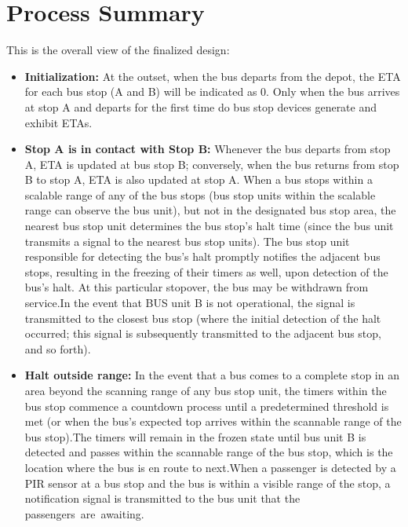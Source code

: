 

\section{Process Summary}

This is the overall view of the finalized design:
\begin{itemize}

\item \textbf{Initialization: }At the outset, when the bus departs from the depot, the ETA for each bus stop (A and B) will be indicated as 0. Only when the bus arrives at stop A and departs for the first time do bus stop devices generate and exhibit ETAs.

\item
\textbf{Stop A is in contact with Stop B: }
Whenever the bus departs from stop A, ETA is updated at bus stop B; conversely, when the bus returns from stop B to stop A, ETA is also updated at stop A. When a bus stops within a scalable range of any of the bus stops (bus stop units within the scalable range can observe the bus unit), but not in the designated bus stop area, the nearest bus stop unit determines the bus stop's halt time (since the bus unit transmits a signal to the nearest bus stop units). The bus stop unit responsible for detecting the bus's halt promptly notifies the adjacent bus stops, resulting in the freezing of their timers as well, upon detection of the bus's halt. At this particular stopover, the bus may be withdrawn from service.In the event that BUS unit B is not operational, the signal is transmitted to the closest bus stop (where the initial detection of the halt occurred; this signal is subsequently transmitted to the adjacent bus stop, and so forth).

\item
\textbf{Halt outside range: }
In the event that a bus comes to a complete stop in an area beyond the scanning range of any bus stop unit, the timers within the bus stop commence a countdown process until a predetermined threshold is met (or when the bus's expected top arrives within the scannable range of the bus stop).The timers will remain in the frozen state until bus unit B is detected and passes within the scannable range of the bus stop, which is the location where the bus is en route to next.When a passenger is detected by a PIR sensor at a bus stop and the bus is within a visible range of the stop, a notification signal is transmitted to the bus unit that the passengers are awaiting.
\end{itemize}